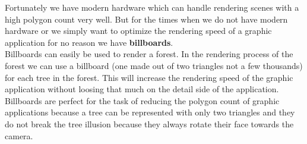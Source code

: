Fortunately we have modern hardware which can handle rendering scenes with a high polygon count very well. But for the times when we do not have modern hardware or we simply want to optimize the rendering speed of a graphic application for no reason we have \textbf{billboards}.\\

Billboards can easily be used to render a forest. In the rendering process of the forest we can use a billboard (one made out of two triangles not a few thousands) for each tree in the forest. This will increase the rendering speed of the graphic application without loosing that much on the detail side of the application.\\

Billboards are perfect for the task of reducing the polygon count of graphic applications because a tree can be represented with only two triangles and they do not break the tree illusion because they always rotate their face towards the camera.\\